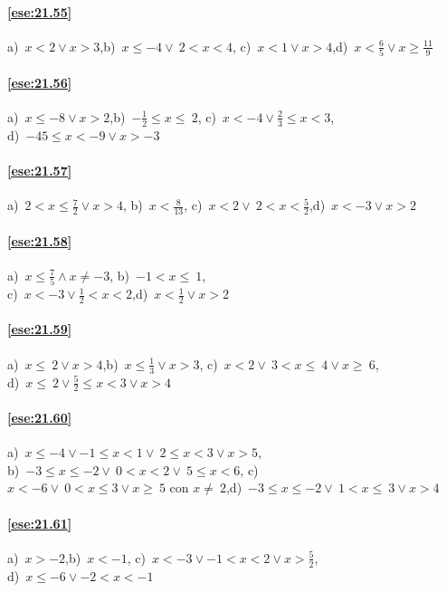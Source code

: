 \begin{multicols}{2}
\paragraph{\ref{ese:21.55}} a)~$x<2\vee x>3$,\quad b)~$x\le -4\vee~2<x<4$,\quad
c)~$x<1\vee x>4$,\quad d)~$x<\frac{6}{5}\vee x\ge\frac{11}{9}$

\paragraph{\ref{ese:21.56}} a)~$x\le -8\vee x>2$,\quad b)~$-{\frac{1}{2}}\le x\le~2$,\quad
c)~$x<-4\vee\frac{2}{3}\le x<3$,\quad \protect\\ d)~$-45\le x<-9\vee x>-3$

\paragraph{\ref{ese:21.57}} a)~$2<x\le \frac{7}{2}\vee x>4$,\quad
b)~$x<\frac{8}{13}$,\quad
c)~$x<2\vee~2<x<\frac{5}{2}$,\quad d)~$x<-3\vee x>2$

\paragraph{\ref{ese:21.58}} a)~$x\le \frac{7}{5}\wedge x\neq-3$,\quad
b)~$-1<x\le~1$,\quad
\protect\\ c)~$x<-3\vee\frac{1}{2}<x<2$,\quad d)~$x<\frac{1}{2}\vee x>2$

\paragraph{\ref{ese:21.59}} a)~$x\le~2\vee x>4$,\quad b)~$x\le \frac{1}{3}\vee x>3$,\quad
c)~$x<2\vee~3<x\le~4\vee x\ge~6$,\quad \protect\\ d)~$x\le~2\vee \frac{5}{2}\le x<3\vee x>4$
\end{multicols}
\paragraph{\ref{ese:21.60}} a)~$x\le -4\vee -1\le x<1\vee~2\le x<3\vee x>5$,\quad
\protect\\ b)~$-3\le x\le -2\vee~0<x<2\vee~5\le x<6$,\quad
c)~$x<-6\vee~0<x\le3\vee x\ge~5\text{ con }x\neq~2$,\quad d)~$-3\le x\le -2\vee~1<x\le~3\vee x>4$

\paragraph{\ref{ese:21.61}} a)~$x>-2$,\quad b)~$x<-1$,\quad
c)~$x<-3\vee -1<x<2\vee x>\frac{5}{2}$,\quad
\protect\\ d)~$x\le -6\vee -2<x<-1$

